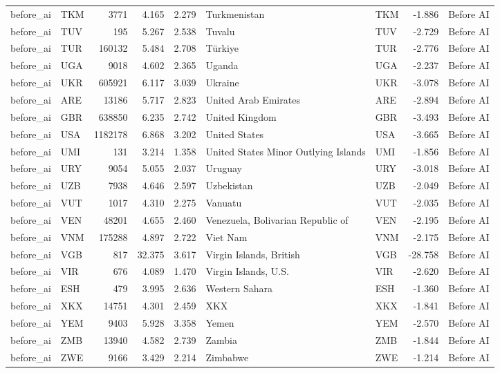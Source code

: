 \begin{tabular}{llrrrllrl}
before\_ai & TKM & 3771 & 4.165 & 2.279 & Turkmenistan & TKM & -1.886 & Before AI \\
before\_ai & TUV & 195 & 5.267 & 2.538 & Tuvalu & TUV & -2.729 & Before AI \\
before\_ai & TUR & 160132 & 5.484 & 2.708 & Türkiye & TUR & -2.776 & Before AI \\
before\_ai & UGA & 9018 & 4.602 & 2.365 & Uganda & UGA & -2.237 & Before AI \\
before\_ai & UKR & 605921 & 6.117 & 3.039 & Ukraine & UKR & -3.078 & Before AI \\
before\_ai & ARE & 13186 & 5.717 & 2.823 & United Arab Emirates & ARE & -2.894 & Before AI \\
before\_ai & GBR & 638850 & 6.235 & 2.742 & United Kingdom & GBR & -3.493 & Before AI \\
before\_ai & USA & 1182178 & 6.868 & 3.202 & United States & USA & -3.665 & Before AI \\
before\_ai & UMI & 131 & 3.214 & 1.358 & United States Minor Outlying Islands & UMI & -1.856 & Before AI \\
before\_ai & URY & 9054 & 5.055 & 2.037 & Uruguay & URY & -3.018 & Before AI \\
before\_ai & UZB & 7938 & 4.646 & 2.597 & Uzbekistan & UZB & -2.049 & Before AI \\
before\_ai & VUT & 1017 & 4.310 & 2.275 & Vanuatu & VUT & -2.035 & Before AI \\
before\_ai & VEN & 48201 & 4.655 & 2.460 & Venezuela, Bolivarian Republic of & VEN & -2.195 & Before AI \\
before\_ai & VNM & 175288 & 4.897 & 2.722 & Viet Nam & VNM & -2.175 & Before AI \\
before\_ai & VGB & 817 & 32.375 & 3.617 & Virgin Islands, British & VGB & -28.758 & Before AI \\
before\_ai & VIR & 676 & 4.089 & 1.470 & Virgin Islands, U.S. & VIR & -2.620 & Before AI \\
before\_ai & ESH & 479 & 3.995 & 2.636 & Western Sahara & ESH & -1.360 & Before AI \\
before\_ai & XKX & 14751 & 4.301 & 2.459 & XKX & XKX & -1.841 & Before AI \\
before\_ai & YEM & 9403 & 5.928 & 3.358 & Yemen & YEM & -2.570 & Before AI \\
before\_ai & ZMB & 13940 & 4.582 & 2.739 & Zambia & ZMB & -1.844 & Before AI \\
before\_ai & ZWE & 9166 & 3.429 & 2.214 & Zimbabwe & ZWE & -1.214 & Before AI \\

\end{tabular}
